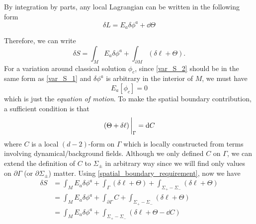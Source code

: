\documentclass[10pt]{article}
\begin{document}
By integration by parts, any local Lagrangian can be written in the following form
\begin{equation}
    \delta L=E_a\delta \phi^a+\dd{\Theta}
\end{equation}

Therefore, we can write
\begin{equation}
    \delta S=\int_M E_a\delta\phi^a+\int_{\partial M}\left(\delta\ell+\Theta\right).\label{var_S_2}
\end{equation}
For a variation around classical solution $\phi_c$, since \cref{var_S_2} should be in the same form as \cref{var_S_1} and $\delta\phi^a$ is arbitrary in the interior of $M$, we must have
\begin{equation}
    E_a[\phi_c]=0
\end{equation}
which is just the \textit{equation of motion}.
To make the spatial boundary contribution, a sufficient condition is that
\begin{equation}\label{spatial_boundary_requirement}
    \eval{\left(\Theta+\delta\ell\right)}_\Gamma=\dd{C}
\end{equation}
where $C$ is a local $(d-2)$-form on $\Gamma$ which is locally constructed from terms involving dynamical/background fields.
Although we only defined $C$ on $\Gamma$, we can extend the definition of $C$ to $\Sigma_{\pm}$ in arbitrary way since we will find only values on $\partial\Gamma$ (or $\partial\Sigma_{\pm}$) matter.
Using \cref{spatial_boundary_requirement}, now we have
\begin{equation}\label{delta_S_1}
    \begin{split}
        \delta S&=\int_M E_a\delta\phi^a+\int_{\Gamma}\left(\delta\ell+\Theta\right)+\int_{\Sigma_+-\Sigma_-}\left(\delta\ell+\Theta\right)\\
        &=\int_M E_a\delta\phi^a+\int_{\partial\Gamma}C+\int_{\Sigma_+-\Sigma_-}\left(\delta\ell+\Theta\right)\\
        &=\int_M E_a\delta\phi^a+\int_{\Sigma_+-\Sigma_-}\left(\delta\ell+\Theta-\dd{C}\right)
    \end{split}
\end{equation}
\end{document}
